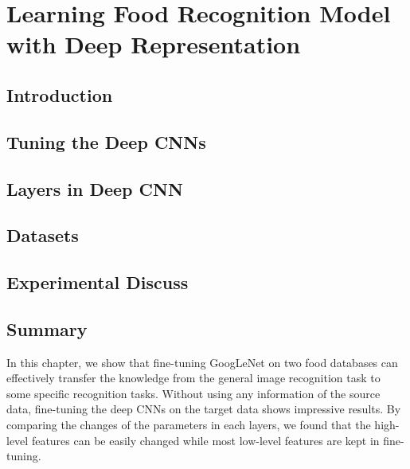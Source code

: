 \chapter{Learning Food Recognition Model with Deep Representation}\label{sec:cnn}

\section{Introduction}


\section{Tuning the Deep CNNs}


\section{Layers in Deep CNN}

\section{Datasets}

\section{Experimental Discuss}

\section{Summary}
In this chapter, we show that fine-tuning GoogLeNet on two food databases can effectively transfer the knowledge from the general image recognition task to some specific recognition tasks. Without using any information of the source data, fine-tuning the deep CNNs on the target data shows impressive results. By comparing the changes of the parameters in each layers, we found that the high-level features can be easily changed while most low-level features are kept in fine-tuning.